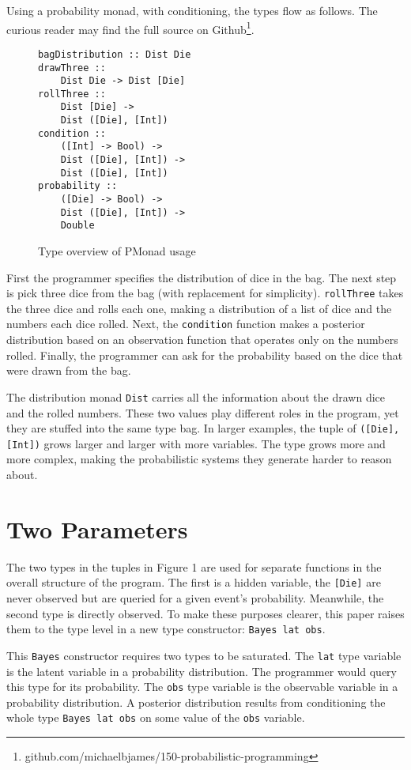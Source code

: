 \documentclass[10pt,twocolumn]{article}
\begin{document}
Using a probability monad, with conditioning, the types flow as follows. The curious reader may find the full source on Github\footnote{github.com/michaelbjames/150-probabilistic-programming}.
\begin{figure}[H]
\begin{verbatim}
bagDistribution :: Dist Die
drawThree ::
    Dist Die -> Dist [Die]
rollThree ::
    Dist [Die] ->
    Dist ([Die], [Int])
condition ::
    ([Int] -> Bool) ->
    Dist ([Die], [Int]) ->
    Dist ([Die], [Int])
probability ::
    ([Die] -> Bool) ->
    Dist ([Die], [Int]) ->
    Double
\end{verbatim}
\caption{Type overview of PMonad usage}
\end{figure}

First the programmer specifies the distribution of dice in the bag. The next step is pick three dice from the bag (with replacement for simplicity). \texttt{rollThree} takes the three dice and rolls each one, making a distribution of a list of dice and the numbers each dice rolled. Next, the \texttt{condition} function makes a posterior distribution based on an observation function that operates only on the numbers rolled. Finally, the programmer can ask for the probability based on the dice that were drawn from the bag.

The distribution monad \texttt{Dist} carries all the information about the drawn dice and the rolled numbers. These two values play different roles in the program, yet they are stuffed into the same type bag. In larger examples, the tuple of \texttt{([Die],[Int])} grows larger and larger with more variables. The type grows more and more complex, making the probabilistic systems they generate harder to reason about.

\section{Two Parameters}
The two types in the tuples in Figure 1 are used for separate functions in the overall structure of the program. The first is a hidden variable, the \texttt{[Die]} are never observed but are queried for a given event's probability. Meanwhile, the second type is directly observed. To make these purposes clearer, this paper raises them to the type level in a new type constructor: \texttt{Bayes lat obs}.

This \texttt{Bayes} constructor requires two types to be saturated. The \texttt{lat} type variable is the latent variable in a probability distribution. The programmer would query this type for its probability. The \texttt{obs} type variable is the observable variable in a probability distribution. A posterior distribution results from conditioning the whole type \texttt{Bayes lat obs} on some value of the \texttt{obs} variable.
\end{document}
